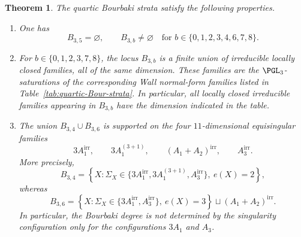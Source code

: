 \documentclass[11pt]{amsart} %
\newtheorem{Theorem}{Theorem}[section]
\theoremstyle{definition}
\begin{document}
\begin{Theorem}\label{quartic-Bour-strata}
The quartic Bourbaki strata satisfy the following properties.

\begin{enumerate}
\item[\rm(i)] One has
\[
B_{3,5}=\varnothing,
\qquad
B_{3,b}\neq\varnothing \quad \text{for } b\in\{0,1,2,3,4,6,7,8\}.
\]

\item[\rm(ii)] For $b\in\{0,1,2,3,7,8\}$, the locus $B_{3,b}$ is a finite union of irreducible locally closed families, all of the same dimension. These families are the $\PGL_3$-saturations of the corresponding Wall normal-form families listed in Table~\ref{tab:quartic-Bour-strata}. In particular, all locally closed irreducible families appearing in $B_{3,b}$ have the dimension indicated in the table.

\item[\rm(iii)]
The union $B_{3,4}\cup B_{3,6}$ is supported on the four
$11$-dimensional equisingular families
\[
3A_1^{\mathrm{irr}},\qquad
3A_1^{(3+1)},\qquad
(A_1+A_2)^{\mathrm{irr}},\qquad
A_3^{\mathrm{irr}}.
\]
More precisely,
\[
B_{3,4}
=
\left\{
X:
\Sigma_X\in
\{3A_1^{\mathrm{irr}},
  3A_1^{(3+1)},
  A_3^{\mathrm{irr}}\},
\ e(X)=2
\right\},
\]
whereas
\[
B_{3,6}
=
\left\{
X:
\Sigma_X\in
\{3A_1^{\mathrm{irr}},A_3^{\mathrm{irr}}\},
\ e(X)=3
\right\}
\sqcup
(A_1+A_2)^{\mathrm{irr}}.
\]
In particular, the Bourbaki degree is not determined by the
singularity configuration only for the configurations
$3A_1$ and $A_3$.
\end{enumerate}
\end{Theorem}
\end{document}

